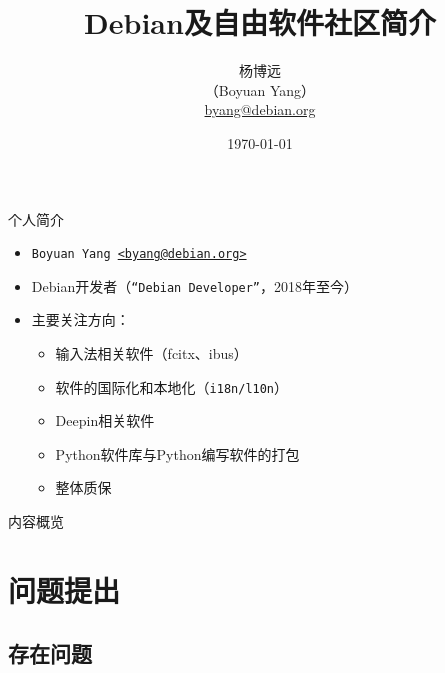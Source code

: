 \documentclass{beamer}
\title[Intro to Debian and FLOSS community]{Debian及自由软件社区简介}
\author[@byang/@hosiet]{杨博远 \\ （Boyuan Yang） \\ \href{mailto:byang@debian.org}{byang@debian.org} }
\institute[Debian]{Debian Project}
\date{\today}
\begin{document}
	
\begin{frame}
\titlepage
\end{frame}

\begin{frame}{个人简介}
	\begin{itemize}
		\item \texttt{Boyuan Yang \href{mailto:byang@debian.org}{<byang@debian.org>}}
		\item Debian开发者（\texttt{“Debian Developer”}，2018年至今）
		\item 主要关注方向： \\
		\begin{itemize}
			\item 输入法相关软件（fcitx、ibus）
			\item 软件的国际化和本地化（\texttt{i18n/l10n}）
			\item Deepin相关软件
			\item Python软件库与Python编写软件的打包
			\item 整体质保
		\end{itemize}
	\end{itemize}
    \vfill
\end{frame}
	

\begin{frame}{内容概览}
\tableofcontents
\end{frame}



\section{问题提出}
\subsection{存在问题}
\end{document}
